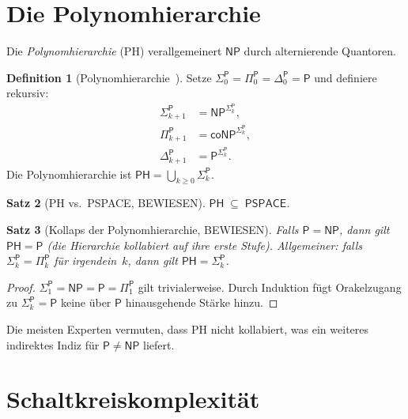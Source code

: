 \documentclass[12pt,a4paper]{amsart}
\newtheorem{theorem}{Satz}[section]
\theoremstyle{definition}
\newtheorem{definition}[theorem]{Definition}
\newcommand{\Pclass}{\mathsf{P}}
\newcommand{\NP}{\mathsf{NP}}
\newcommand{\coNP}{\mathsf{coNP}}
\newcommand{\PSPACE}{\mathsf{PSPACE}}
\newcommand{\PH}{\mathsf{PH}}
\begin{document}
\section{Die Polynomhierarchie}
\label{sec:ph}

Die \emph{Polynomhierarchie} (PH) verallgemeinert $\NP$ durch alternierende
Quantoren.

\begin{definition}[Polynomhierarchie~\cite{stockmeyer1976}]
Setze $\Sigma_0^\Pclass = \Pi_0^\Pclass = \Delta_0^\Pclass = \Pclass$ und
definiere rekursiv:
\begin{align*}
  \Sigma_{k+1}^\Pclass &= \NP^{\Sigma_k^\Pclass},\\
  \Pi_{k+1}^\Pclass &= \coNP^{\Sigma_k^\Pclass},\\
  \Delta_{k+1}^\Pclass &= \Pclass^{\Sigma_k^\Pclass}.
\end{align*}
Die Polynomhierarchie ist $\PH = \bigcup_{k\geq 0}\Sigma_k^\Pclass$.
\end{definition}

\begin{theorem}[PH vs.\ PSPACE, BEWIESEN]
$\PH \;\subseteq\; \PSPACE$.
\end{theorem}

\begin{theorem}[Kollaps der Polynomhierarchie, BEWIESEN]
Falls $\Pclass = \NP$, dann gilt $\PH = \Pclass$ (die Hierarchie kollabiert
auf ihre erste Stufe).  Allgemeiner: falls $\Sigma_k^\Pclass = \Pi_k^\Pclass$
für irgendein~$k$, dann gilt $\PH = \Sigma_k^\Pclass$.
\end{theorem}

\begin{proof}
$\Sigma_1^\Pclass = \NP = \Pclass = \Pi_1^\Pclass$ gilt trivialerweise.
Durch Induktion fügt Orakelzugang zu $\Sigma_k^\Pclass = \Pclass$ keine
über $\Pclass$ hinausgehende Stärke hinzu.
\end{proof}

Die meisten Experten vermuten, dass PH nicht kollabiert, was ein weiteres
indirektes Indiz für $\Pclass\neq\NP$ liefert.

\section{Schaltkreiskomplexität}
\label{sec:schaltkreis}
\end{document}
